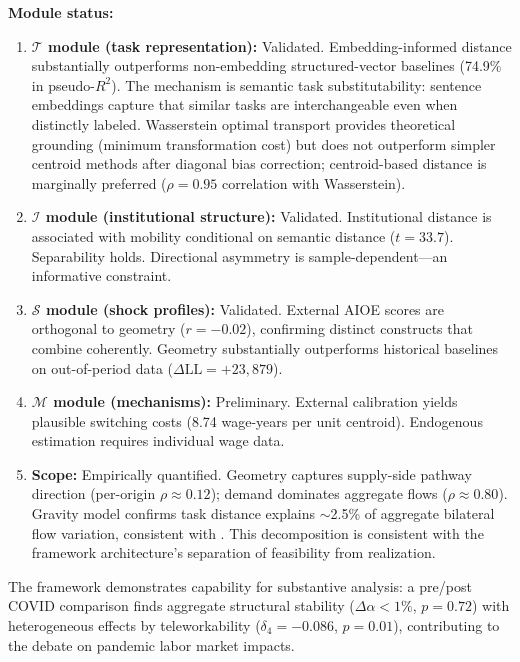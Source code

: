 \documentclass[12pt]{article}
\begin{document}
\textbf{Module status:}
\begin{enumerate}
    \item \textbf{$\mathcal{T}$ module (task representation):} Validated. Embedding-informed distance substantially outperforms non-embedding structured-vector baselines (74.9\% in pseudo-$R^2$). The mechanism is semantic task substitutability: sentence embeddings capture that similar tasks are interchangeable even when distinctly labeled. Wasserstein optimal transport provides theoretical grounding (minimum transformation cost) but does not outperform simpler centroid methods after diagonal bias correction; centroid-based distance is marginally preferred ($\rho = 0.95$ correlation with Wasserstein).
    
    \item \textbf{$\mathcal{I}$ module (institutional structure):} Validated. Institutional distance is associated with mobility conditional on semantic distance ($t = 33.7$). Separability holds. Directional asymmetry is sample-dependent---an informative constraint.
    
    \item \textbf{$\mathcal{S}$ module (shock profiles):} Validated. External AIOE scores are orthogonal to geometry ($r = -0.02$), confirming distinct constructs that combine coherently. Geometry substantially outperforms historical baselines on out-of-period data ($\Delta\text{LL} = +23{,}879$).
    
    \item \textbf{$\mathcal{M}$ module (mechanisms):} Preliminary. External calibration yields plausible switching costs (8.74 wage-years per unit centroid). Endogenous estimation requires individual wage data.
    
    \item \textbf{Scope:} Empirically quantified. Geometry captures supply-side pathway direction (per-origin $\rho \approx 0.12$); demand dominates aggregate flows ($\rho \approx 0.80$). Gravity model confirms task distance explains $\sim$2.5\% of aggregate bilateral flow variation, consistent with \citet{CortesGallipoli2018}. This decomposition is consistent with the framework architecture's separation of feasibility from realization.
\end{enumerate}

The framework demonstrates capability for substantive analysis: a pre/post COVID comparison finds aggregate structural stability ($\Delta\alpha < 1\%$, $p = 0.72$) with heterogeneous effects by teleworkability ($\delta_4 = -0.086$, $p = 0.01$), contributing to the debate on pandemic labor market impacts.
\end{document}
